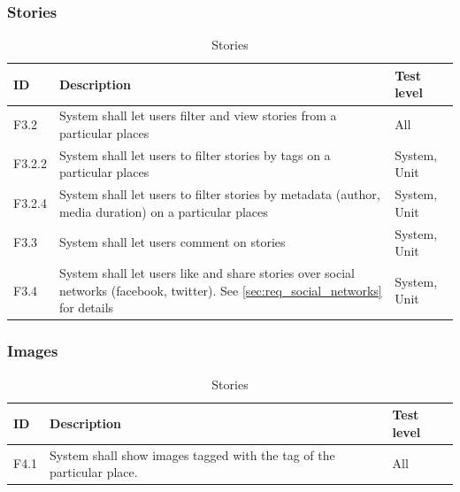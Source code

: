 \documentclass[11pt]{book}
\begin{document}
\subsubsection{Stories}

\begin{table}[H]
\centering
\begin{tabular}{ l  p{11cm} l }
    ID       & Description                                                                                              & Test level            \\ \hline
    F3.2     & System shall let users filter and view stories from a particular places                                  & All                   \\ \hline
    F3.2.2   & System shall let users to filter stories by tags on a particular places                                  & System, Unit     \\ \hline
    F3.2.4   & System shall let users to filter stories by metadata (author, media duration) on a particular places     & System, Unit     \\ \hline
    F3.3     & System shall let users comment on stories                                                                & System, Unit     \\ \hline
    F3.4     & System shall let users like and share stories over social networks (facebook, twitter). 
               See \ref{sec:req_social_networks} for details                                                            & System, Unit     \\
    \end{tabular}
\caption{Stories}
\label{tab:req_stories}
\end{table}

\subsubsection{Images}

\begin{table}[H]
\centering
\begin{tabular}{ l  p{11cm} l }
    ID       & Description                                                                                              & Test level            \\ \hline
    F4.1     & System shall show images tagged with the tag of the particular place.                                    & All                   \\
    \end{tabular}
\caption{Stories}
\label{tab:req_images}
\end{table}
\end{document}
